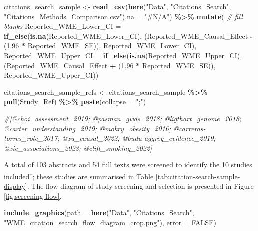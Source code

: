 \documentclass[
]{article}
\newenvironment{Shaded}{\begin{snugshade}}{\end{snugshade}}
\newcommand{\AttributeTok}[1]{\textcolor[rgb]{0.13,0.29,0.53}{#1}}
\newcommand{\CommentTok}[1]{\textcolor[rgb]{0.56,0.35,0.01}{\textit{#1}}}
\newcommand{\ConstantTok}[1]{\textcolor[rgb]{0.56,0.35,0.01}{#1}}
\newcommand{\FloatTok}[1]{\textcolor[rgb]{0.00,0.00,0.81}{#1}}
\newcommand{\FunctionTok}[1]{\textcolor[rgb]{0.13,0.29,0.53}{\textbf{#1}}}
\newcommand{\NormalTok}[1]{#1}
\newcommand{\OtherTok}[1]{\textcolor[rgb]{0.56,0.35,0.01}{#1}}
\newcommand{\SpecialCharTok}[1]{\textcolor[rgb]{0.81,0.36,0.00}{\textbf{#1}}}
\newcommand{\StringTok}[1]{\textcolor[rgb]{0.31,0.60,0.02}{#1}}
\begin{document}
\begin{Shaded}
\begin{Highlighting}[]
\NormalTok{citations\_search\_sample }\OtherTok{\textless{}{-}} \FunctionTok{read\_csv}\NormalTok{(}\FunctionTok{here}\NormalTok{(}\StringTok{"Data"}\NormalTok{, }\StringTok{"Citations\_Search"}\NormalTok{, }\StringTok{"Citations\_Methods\_Comparison.csv"}\NormalTok{),}\AttributeTok{na =} \StringTok{"\#N/A"}\NormalTok{) }\SpecialCharTok{\%\textgreater{}\%} 
  \FunctionTok{mutate}\NormalTok{(}
    \CommentTok{\# fill blanks}
    \AttributeTok{Reported\_WME\_Lower\_CI =} \FunctionTok{if\_else}\NormalTok{(}\FunctionTok{is.na}\NormalTok{(Reported\_WME\_Lower\_CI), }
\NormalTok{                                    (Reported\_WME\_Causal\_Effect }\SpecialCharTok{{-}}\NormalTok{ (}\FloatTok{1.96} \SpecialCharTok{*}\NormalTok{ Reported\_WME\_SE)),}
\NormalTok{                                    Reported\_WME\_Lower\_CI),}
    \AttributeTok{Reported\_WME\_Upper\_CI =} \FunctionTok{if\_else}\NormalTok{(}\FunctionTok{is.na}\NormalTok{(Reported\_WME\_Upper\_CI),}
\NormalTok{                                    (Reported\_WME\_Causal\_Effect }\SpecialCharTok{+}\NormalTok{ (}\FloatTok{1.96} \SpecialCharTok{*}\NormalTok{ Reported\_WME\_SE)),}
\NormalTok{                                    Reported\_WME\_Upper\_CI))}

\NormalTok{citations\_search\_sample\_refs }\OtherTok{\textless{}{-}}\NormalTok{ citations\_search\_sample }\SpecialCharTok{\%\textgreater{}\%} \FunctionTok{pull}\NormalTok{(Study\_Ref) }\SpecialCharTok{\%\textgreater{}\%}  \FunctionTok{paste}\NormalTok{(}\AttributeTok{collapse =} \StringTok{";"}\NormalTok{) }

\CommentTok{\#[@choi\_assessment\_2019; @pasman\_gwas\_2018; @ligthart\_genome\_2018; @carter\_understanding\_2019; @mokry\_obesity\_2016; @carreras{-}torres\_role\_2017; @xu\_causal\_2022; @budu{-}aggrey\_evidence\_2019; @xie\_associations\_2023; @clift\_smoking\_2022]}
\end{Highlighting}
\end{Shaded}

A total of 103 abstracts and 54 full texts were screened to identify the 10 studies included\textsuperscript{--}; these studies are summarised in Table \ref{tab:citation-search-sample-display}. The flow diagram of study screening and selection is presented in Figure \ref{fig:screening-flow}.

\begin{Shaded}
\begin{Highlighting}[]
\FunctionTok{include\_graphics}\NormalTok{(}\AttributeTok{path =} \FunctionTok{here}\NormalTok{(}\StringTok{"Data"}\NormalTok{, }\StringTok{"Citations\_Search"}\NormalTok{, }\StringTok{"WME\_citation\_search\_flow\_diagram\_crop.png"}\NormalTok{),}
                 \AttributeTok{error =} \ConstantTok{FALSE}\NormalTok{)}
\end{Highlighting}
\end{Shaded}
\end{document}
